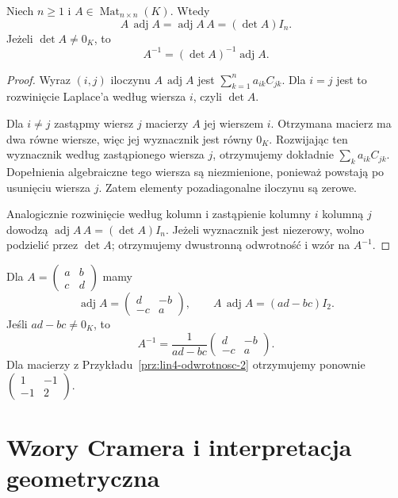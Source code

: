 \begin{twierdzenie}
\label{thm:lin6-dolaczona}
Niech \(n\geq1\) i
\(A\in\operatorname{Mat}_{n\times n}(K)\).
Wtedy
\[
 A\,\operatorname{adj}A
 =\operatorname{adj}A\,A
 =(\det A)I_n.
\]
Jeżeli \(\det A\ne0_K\), to
\[
 A^{-1}=(\det A)^{-1}\operatorname{adj}A.
\]
\end{twierdzenie}
\begin{proof}
Wyraz \((i,j)\) iloczynu
\(A\,\operatorname{adj}A\) jest
\(\sum_{k=1}^{n}a_{ik}C_{jk}\).
Dla \(i=j\) jest to rozwinięcie
Laplace'a według wiersza \(i\),
czyli \(\det A\).

Dla \(i\ne j\) zastąpmy wiersz \(j\)
macierzy \(A\) jej wierszem \(i\).
Otrzymana macierz ma dwa równe wiersze,
więc jej wyznacznik jest równy \(0_K\).
Rozwijając ten wyznacznik według
zastąpionego wiersza \(j\),
otrzymujemy dokładnie
\(\sum_k a_{ik}C_{jk}\).
Dopełnienia algebraiczne tego wiersza
są niezmienione, ponieważ powstają
po usunięciu wiersza \(j\).
Zatem elementy pozadiagonalne
iloczynu są zerowe.

Analogicznie rozwinięcie według kolumn
i zastąpienie kolumny \(i\) kolumną \(j\)
dowodzą
\(\operatorname{adj}A\,A=(\det A)I_n\).
Jeżeli wyznacznik jest niezerowy,
wolno podzielić przez \(\det A\);
otrzymujemy dwustronną odwrotność
i wzór na \(A^{-1}\).
\end{proof}

\begin{przyklad}
\label{prz:lin6-adjugate-2}
Dla \(A=\begin{pmatrix}a&b\\c&d\end{pmatrix}\)
mamy
\[
 \operatorname{adj}A
 =\begin{pmatrix}d&-b\\-c&a\end{pmatrix},
 \qquad
 A\,\operatorname{adj}A=(ad-bc)I_2.
\]
Jeśli \(ad-bc\ne0_K\), to
\[
 A^{-1}=\frac{1}{ad-bc}
 \begin{pmatrix}d&-b\\-c&a\end{pmatrix}.
\]
Dla macierzy z
Przykładu~\ref{prz:lin4-odwrotnosc-2}
otrzymujemy ponownie
\(\begin{pmatrix}1&-1\\-1&2\end{pmatrix}\).
\end{przyklad}

\section{Wzory Cramera i interpretacja geometryczna}
\label{sec:lin6-cramer}

